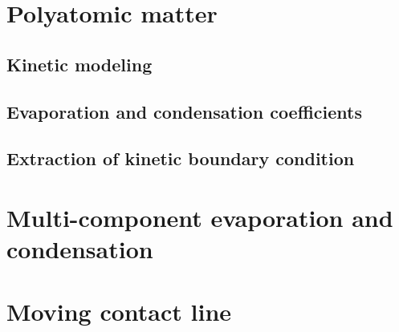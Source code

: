 \newpage


\section{Polyatomic matter}


\subsection{Kinetic modeling}

\subsection{Evaporation and condensation coefficients}

\subsection{Extraction of kinetic boundary condition}


\newpage


\section{Multi-component evaporation and condensation}

\newpage 

\section{Moving contact line}
\newpage 




